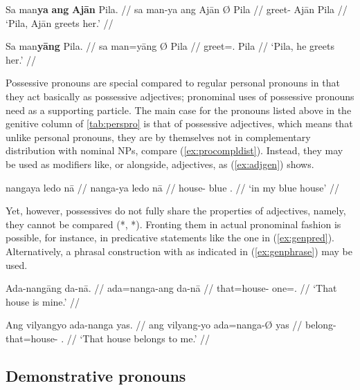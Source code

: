 \pex
\a\begingl
	\gla Sa man\textbf{ya} \textbf{ang} \textbf{Ajān} {} Pila. //
	\glb sa man-ya ang ​Ajān Ø ​Pila //
	\glc \PatT{} greet-\TsgM{} \Aarg{} ​Ajān \Top{} ​Pila //
	\glft `Pila, Ajān greets her.' //
\endgl

\a\begingl
	\gla Sa man\textbf{yāng} {} Pila. //
	\glb sa man=yāng Ø ​Pila //
	\glc \PatT{} greet=\TsgM{}.\Aarg{} \Top{} Pila //
	\glft `Pila, he greets her.' //
\endgl
\xe


\label{phsec:possadj}
Possessive pronouns are special compared to regular personal pronouns in that
they act basically as possessive adjectives; pronominal uses of possessive
pronouns need  as a supporting particle. The main case for the
pronouns listed above in the genitive column of \autoref{tab:perspro} is that
of possessive adjectives, which means that unlike personal pronouns, they are
by themselves not in complementary distribution with nominal NPs, compare
(\ref{ex:procompldist}). Instead, they may be used as modifiers like, or
alongside, adjectives, as (\ref{ex:adjgen}) shows.

\ex\label{ex:adjgen}
\begingl
	\gla nangaya ledo nā //
	\glb nanga-ya ledo nā //
	\glc house-\Loc{} blue \Fsg{}.\Gen{} //
	\glft `in my blue house' //
\endgl
\xe

Yet, however, possessives do not fully share the properties of adjectives,
namely, they cannot be compared (*,
*). Fronting them in actual pronominal fashion is
possible, for instance, in predicative statements like the one in
(\ref{ex:genpred}). Alternatively, a phrasal construction with
 as indicated in (\ref{ex:genphrase}) may be 
used.

\pex
\a\label{ex:genpred}\begingl
	\gla Ada-nangāng da-nā. //
	\glb ada=nanga-ang da-nā //
	\glc that=house-\Aarg{} one=\Fsg{}.\Gen{} //
	\glft `That house is mine.' //
\endgl

\a\label{ex:genphrase}\begingl
	\gla Ang vilyangyo ada-nanga yas. //
	\glb ang vilyang-yo ada=nanga-Ø yas //
	\glc \AgtT{} belong-\TsgN{} that=house-\Top{} \Fsg{}.\Parg{} //
	\glft `That house belongs to me.' //
\endgl
\xe


\subsection{Demonstrative pronouns}
\label{subsec:dempro}

